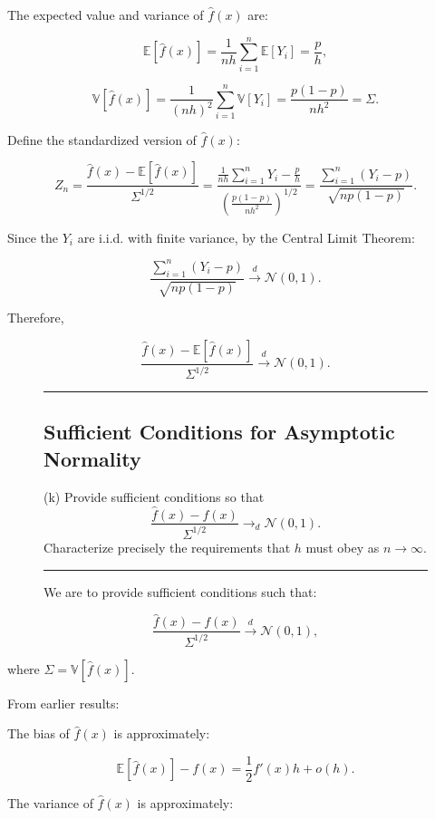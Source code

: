 \documentclass{article}
\newenvironment{colorparagraph}[1]{\par\color{#1}}{\par}
\begin{document}
The expected value and variance of \( \hat{f}(x) \) are:

\[
\mathbb{E}[\hat{f}(x)] = \frac{1}{n h} \sum_{i=1}^n \mathbb{E}[Y_i] = \frac{p}{h},
\]

\[
\mathbb{V}[\hat{f}(x)] = \frac{1}{(n h)^2} \sum_{i=1}^n \mathbb{V}[Y_i] = \frac{p (1 - p)}{n h^2} = \Sigma.
\]

Define the standardized version of \( \hat{f}(x) \):

\[
Z_n = \frac{\hat{f}(x) - \mathbb{E}[\hat{f}(x)]}{\Sigma^{1/2}} = \frac{\frac{1}{n h} \sum_{i=1}^n Y_i - \frac{p}{h}}{\left( \frac{p (1 - p)}{n h^2} \right)^{1/2}} = \frac{\sum_{i=1}^n (Y_i - p)}{\sqrt{n p (1 - p)}}.
\]

Since the \( Y_i \) are i.i.d. with finite variance, by the Central Limit Theorem:

\[
\frac{\sum_{i=1}^n (Y_i - p)}{\sqrt{n p (1 - p)}} \xrightarrow{d} \mathcal{N}(0, 1).
\]

Therefore,

\[
\frac{\hat{f}(x) - \mathbb{E}[\hat{f}(x)]}{\Sigma^{1/2}} \xrightarrow{d} \mathcal{N}(0, 1).
\]

\begin{figure}[H]
\begin{colorparagraph}{questioncolor}
\label{q2k}
\rule{\textwidth}{0.5pt}
\subsection{Sufficient Conditions for Asymptotic Normality}
(k) Provide sufficient conditions so that
\[
\frac{\hat{f}(x) - f(x)}{\Sigma^{1/2}} \to_d \mathcal{N}(0, 1).
\]
Characterize precisely the requirements that \( h \) must obey as \( n \to \infty \).

\rule{\textwidth}{0.5pt}
\end{colorparagraph}

We are to provide sufficient conditions such that:
\end{figure}

\[
\frac{\hat{f}(x) - f(x)}{\Sigma^{1/2}} \xrightarrow{d} \mathcal{N}(0, 1),
\]

where \(\Sigma = \mathbb{V}[\hat{f}(x)]\).

From earlier results:

The bias of \(\hat{f}(x)\) is approximately:

\[
\mathbb{E}[\hat{f}(x)] - f(x) = \frac{1}{2} f'(x) h + o(h).
\]

The variance of \(\hat{f}(x)\) is approximately:
\end{document}
